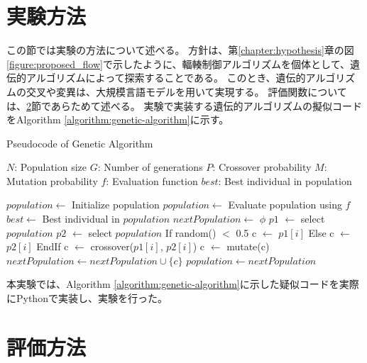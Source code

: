 \documentclass[a4paper,11pt]{jreport}
\newcommand{\figref}[1]{図\ref{#1}}
\newcommand{\chapref}[1]{第\ref{#1}章}
\newcommand{\secref}[1]{\ref{#1}節}
\newcommand{\algorithmref}[1]{Algorithm \ref{#1}}
\begin{document}
\section{実験方法}
\label{section:experiment-method}
この節では実験の方法について述べる。
方針は、\chapref{chapter:hypothesis}の\figref{figure:proposed_flow}で示したように、輻輳制御アルゴリズムを個体として、遺伝的アルゴリズムによって探索することである。
このとき、遺伝的アルゴリズムの交叉や変異は、大規模言語モデルを用いて実現する。
評価関数については、\secref{section:evaluation-method}であらためて述べる。
実験で実装する遺伝的アルゴリズムの擬似コードを\algorithmref{algorithm:genetic-algorithm}に示す。
\begin{algorithm}[htbp]
  \caption{Pseudocode of Genetic Algorithm}
  \label{algorithm:genetic-algorithm}
  \begin{algorithmic}[1]
    \Require
      \Statex $N$: Population size
      \Statex $G$: Number of generations
      \Statex $P$: Crossover probability
      \Statex $M$: Mutation probability
      \Statex $f$: Evaluation function
    \Ensure
      \Statex $best$: Best individual in population

    \State $population \gets$ Initialize population
      \State $population \gets$ Evaluate population using $f$
      \State $best \gets$ Best individual in $population$
      \State $nextPopulation \gets$ $\phi$
      \State $p1$ $\gets$ select $population$
      \State $p2$ $\gets$ select $population$
        If {random() $<$ 0.5}
          c $\gets$ $p1[i]$
        Else
          c $\gets$ $p2[i]$
        EndIf
          c $\gets$ crossover($p1[i]$, $p2[i]$)
        \EndIf
          c $\gets$ mutate(c)
        \EndIf
        \State $nextPopulation \gets nextPopulation \cup \{c\}$
      \EndFor
      \State $population \gets nextPopulation$
    \EndFor
  \end{algorithmic}
\end{algorithm}
本実験では、\algorithmref{algorithm:genetic-algorithm}に示した疑似コードを実際にPythonで実装し、実験を行った。

\section{評価方法}
\label{section:evaluation-method}
\end{document}
